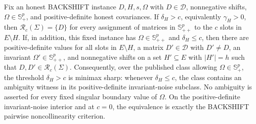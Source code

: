 Fix an honest BACKSHIFT instance \(D,H,s,\Omega\) with \(D\in\mathcal D\), nonnegative shifts, \(\Omega\in\mathbb S_{+}^{p}\), and positive-definite honest covariances. If \(\delta_H>c\), equivalently \(\gamma_H>0\), then \(\mathcal R_c(\Sigma)=\{D\}\) for every assignment of matrices in \(\mathbb S_{++}^{p}\) to the \(c\) slots in \(E\setminus H\). If, in addition, this fixed instance has \(\Omega\in\mathbb S_{++}^{p}\) and \(\delta_H\le c\), then there are positive-definite values for all slots in \(E\setminus H\), a matrix \(D'\in\mathcal D\) with \(D'\ne D\), an invariant \(\Omega'\in\mathbb S_{++}^{p}\), and nonnegative shifts on a set \(H'\subseteq E\) with \(|H'|=h\) such that \(D,D'\in\mathcal R_c(\Sigma)\). Consequently, over the published class allowing \(\Omega\in\mathbb S_{+}^{p}\), the threshold \(\delta_H>c\) is minimax sharp: whenever \(\delta_H\le c\), the class contains an ambiguity witness in its positive-definite invariant-noise subclass. No ambiguity is asserted for every fixed singular boundary value of \(\Omega\). On the positive-definite invariant-noise interior and at \(c=0\), the equivalence is exactly the BACKSHIFT pairwise noncollinearity criterion.